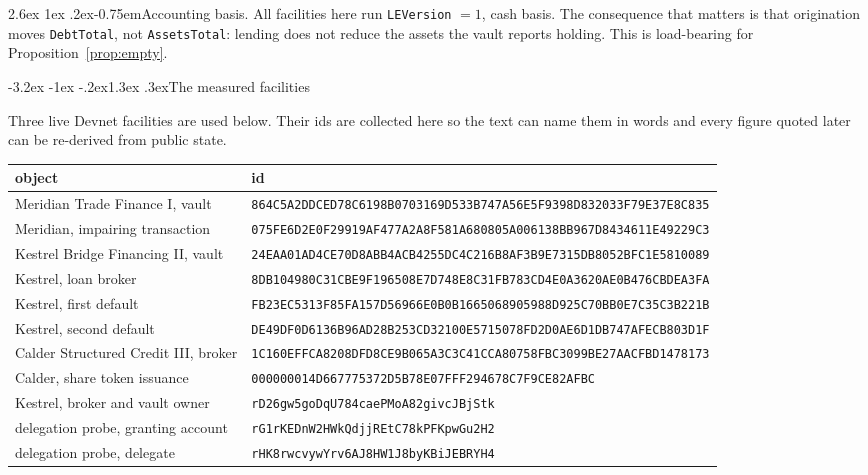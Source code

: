 \documentclass[11pt]{article}
\makeatletter
\renewcommand{\arraystretch}{1.22}
\renewcommand\subsection{\@startsection{subsection}{2}{\z@}%
  {-3.2ex \@plus -1ex \@minus -.2ex}{1.3ex \@plus .3ex}{\normalfont\large\bfseries}}
\renewcommand\paragraph{\@startsection{paragraph}{4}{\z@}%
  {2.6ex \@plus 1ex \@minus .2ex}{-0.75em}{\normalfont\normalsize\bfseries}}
\theoremstyle{orma}
\theoremstyle{ormaupright}
\makeatother
\begin{document}
\paragraph{Accounting basis.} All facilities here run \texttt{LEVersion} $=1$, cash basis.
The consequence that matters is that origination moves \texttt{DebtTotal}, not
\texttt{AssetsTotal}: lending does not reduce the assets the vault reports holding. This is
load-bearing for Proposition~\ref{prop:empty}.

\subsection{The measured facilities}

Three live Devnet facilities are used below. Their ids are collected here so the text can
name them in words and every figure quoted later can be re-derived from public state.

\begin{center}
\scriptsize
\setlength{\tabcolsep}{6pt}
\renewcommand{\arraystretch}{1.35}
\begin{tabular}{ll}
\toprule
object & id \\
\midrule
Meridian Trade Finance I, vault & \texttt{864C5A2DDCED78C6198B0703169D533B747A56E5F9398D832033F79E37E8C835} \\
Meridian, impairing transaction & \texttt{075FE6D2E0F29919AF477A2A8F581A680805A006138BB967D8434611E49229C3} \\
Kestrel Bridge Financing II, vault & \texttt{24EAA01AD4CE70D8ABB4ACB4255DC4C216B8AF3B9E7315DB8052BFC1E5810089} \\
Kestrel, loan broker & \texttt{8DB104980C31CBE9F196508E7D748E8C31FB783CD4E0A3620AE0B476CBDEA3FA} \\
Kestrel, first default & \texttt{FB23EC5313F85FA157D56966E0B0B1665068905988D925C70BB0E7C35C3B221B} \\
Kestrel, second default & \texttt{DE49DF0D6136B96AD28B253CD32100E5715078FD2D0AE6D1DB747AFECB803D1F} \\
Calder Structured Credit III, broker & \texttt{1C160EFFCA8208DFD8CE9B065A3C3C41CCA80758FBC3099BE27AACFBD1478173} \\
Calder, share token issuance & \texttt{000000014D667775372D5B78E07FFF294678C7F9CE82AFBC} \\
Kestrel, broker and vault owner & \texttt{rD26gw5goDqU784caePMoA82givcJBjStk} \\
delegation probe, granting account & \texttt{rG1rKEDnW2HWkQdjjREtC78kPFKpwGu2H2} \\
delegation probe, delegate & \texttt{rHK8rwcvywYrv6AJ8HW1J8byKBiJEBRYH4} \\
\bottomrule
\end{tabular}
\end{center}
\end{document}
